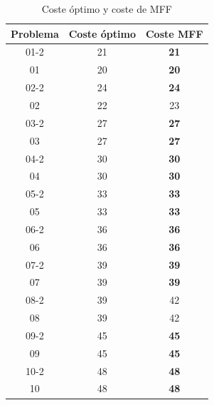 \documentclass{article}
\begin{document}
\begin{table}[H]
\centering
\caption{Coste óptimo y coste de MFF}
\label{my-label}
\begin{tabular}{|c|c|c|}
\hline
\textbf{Problema} & \textbf{Coste óptimo} & \textbf{Coste MFF} \\ \hline
01-2              & 21                    & \textbf{21}        \\ \hline
01                & 20                    & \textbf{20}        \\ \hline
02-2              & 24                    & \textbf{24}        \\ \hline
02                & 22                    & 23                 \\ \hline
03-2              & 27                    & \textbf{27}        \\ \hline
03                & 27                    & \textbf{27}        \\ \hline
04-2              & 30                    & \textbf{30}        \\ \hline
04                & 30                    & \textbf{30}        \\ \hline
05-2              & 33                    & \textbf{33}        \\ \hline
05                & 33                    & \textbf{33}        \\ \hline
06-2              & 36                    & \textbf{36}        \\ \hline
06                & 36                    & \textbf{36}        \\ \hline
07-2              & 39                    & \textbf{39}        \\ \hline
07                & 39                    & \textbf{39}        \\ \hline
08-2              & 39                    & 42                 \\ \hline
08                & 39                    & 42                 \\ \hline
09-2              & 45                    & \textbf{45}        \\ \hline
09                & 45                    & \textbf{45}        \\ \hline
10-2              & 48                    & \textbf{48}        \\ \hline
10                & 48                    & \textbf{48}        \\ \hline
\end{tabular}
\end{table}
\end{document}
